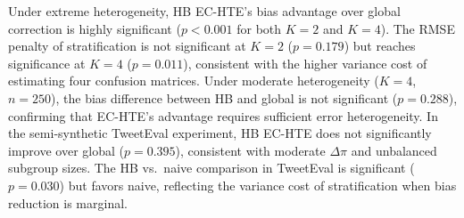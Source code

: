 \begin{table}[t]
\centering
\caption{Paired comparisons for representative configurations. $\Delta$ = method A $-$ method B (negative favors A for $|\text{bias}|$). Two-sample $z$-tests for synthetic DGP; paired $t$-tests for semi-synthetic TweetEval. Bold $p$-values indicate significance at $\alpha = 0.05$.}
\label{tab:mcse}
\small
{}
\end{table}

Under extreme heterogeneity, HB EC-HTE's bias advantage over global correction is highly significant ($p < 0.001$ for both $K{=}2$ and $K{=}4$).
The RMSE penalty of stratification is not significant at $K{=}2$ ($p = 0.179$) but reaches significance at $K{=}4$ ($p = 0.011$), consistent with the higher variance cost of estimating four confusion matrices.
Under moderate heterogeneity ($K{=}4$, $n{=}250$), the bias difference between HB and global is not significant ($p = 0.288$), confirming that EC-HTE's advantage requires sufficient error heterogeneity.
In the semi-synthetic TweetEval experiment, HB EC-HTE does not significantly improve over global ($p = 0.395$), consistent with moderate $\Delta\pi$ and unbalanced subgroup sizes.
The HB vs.\ naive comparison in TweetEval is significant ($p = 0.030$) but favors naive, reflecting the variance cost of stratification when bias reduction is marginal.


